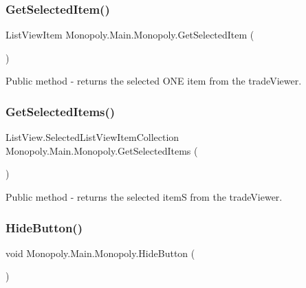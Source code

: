 \subsubsection{\texorpdfstring{Get\+Selected\+Item()}{GetSelectedItem()}}
{\footnotesize\ttfamily List\+View\+Item Monopoly.\+Main.\+Monopoly.\+Get\+Selected\+Item (\begin{DoxyParamCaption}{ }\end{DoxyParamCaption})\hspace{0.3cm}{\ttfamily [inline]}}

Public method -\/ returns the selected O\+NE item from the trade\+Viewer. \mbox{\label{class_monopoly_1_1_main_1_1_monopoly_a1cd60b17d6bfeab1256c981bfa60aa48}} 
\subsubsection{\texorpdfstring{Get\+Selected\+Items()}{GetSelectedItems()}}
{\footnotesize\ttfamily List\+View.\+Selected\+List\+View\+Item\+Collection Monopoly.\+Main.\+Monopoly.\+Get\+Selected\+Items (\begin{DoxyParamCaption}{ }\end{DoxyParamCaption})\hspace{0.3cm}{\ttfamily [inline]}}

Public method -\/ returns the selected itemS from the trade\+Viewer. \mbox{\label{class_monopoly_1_1_main_1_1_monopoly_a97e18d6cc1b63c87022451514ea8bce9}} 
\subsubsection{\texorpdfstring{Hide\+Button()}{HideButton()}}
{\footnotesize\ttfamily void Monopoly.\+Main.\+Monopoly.\+Hide\+Button (\begin{DoxyParamCaption}{ }\end{DoxyParamCaption})\hspace{0.3cm}{\ttfamily [inline]}}

